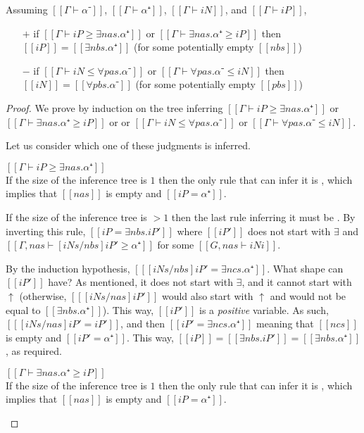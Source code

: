 \begin{lemma}
  \label{lemma:var-subt}
  Assuming $[[Γ ⊢  α⁻]]$, $[[Γ ⊢ α⁺]]$, $[[Γ ⊢ iN]]$, and $[[Γ ⊢ iP]]$,
  \begin{itemize}
  \item[$+$] if $[[Γ ⊢ iP ≥ ∃nas.α⁺]]$ or $[[Γ ⊢ ∃nas.α⁺ ≥ iP ]]$ then $[[iP]] = [[∃nbs.α⁺]]$ (for some potentially empty $[[nbs]]$)
  \item[$-$] if $[[Γ ⊢ iN ≤ ∀pas.α⁻]]$ or $[[Γ ⊢ ∀pas.α⁻ ≤ iN ]]$ then $[[iN]] = [[∀pbs.α⁻]]$ (for some potentially empty $[[pbs]]$)
  \end{itemize}
\end{lemma}
\begin{proof}
  We prove by induction on the tree
  inferring $[[Γ ⊢ iP ≥ ∃nas.α⁺]]$ or $[[Γ ⊢ ∃nas.α⁺ ≥ iP ]]$ or
  or $[[Γ ⊢ iN ≤ ∀pas.α⁻]]$ or $[[Γ ⊢ ∀pas.α⁻ ≤ iN ]]$.

  Let us consider which one of these judgments is inferred.
  \begin{caseof}
  \item $[[Γ ⊢ iP ≥ ∃nas.α⁺]]$\\
    If the size of the inference tree is $1$ then the only rule that can infer
    it is , which
    implies that $[[nas]]$ is empty and $[[iP = α⁺]]$.

    If the size of the inference tree is $>1$ then the last rule inferring
    it must be . By inverting this rule,
    $[[iP = ∃nbs.iP']]$ where $[[iP']]$ does not start with $\exists$ and
    $[[Γ, nas ⊢ [iNs/nbs] iP' ≥ α⁺]]$ for some $[[G, nas ⊢ iNi]]$.

    By the induction hypothesis, $[[ [iNs/nbs] iP' = ∃ncs.α⁺]]$.
    What shape can $[[iP']]$ have?
    As mentioned, it does not start with $\exists$, and it cannot start with
    $\uparrow$ (otherwise, $[[ [iNs/nas] iP' ]]$ would also
    start with $\uparrow$ and would not be equal to $[[∃nbs.α⁺]]$).
    This way, $[[iP']]$ is a \emph{positive} variable. 
    As such, $[[ [iNs/nas] iP' = iP']]$,
    and then $[[iP' = ∃ncs.α⁺]]$ meaning that $[[ncs]]$ is empty and $[[iP' = α⁺]]$.
    This way, $[[iP]] = [[∃nbs.iP']] = [[∃nbs.α⁺]]$, as required.

  \item $[[Γ ⊢ ∃nas.α⁺ ≥ iP]]$\\
    If the size of the inference tree is $1$ then the only rule that can infer
    it is , which
    implies that $[[nas]]$ is empty and $[[iP = α⁺]]$.


\end{caseof}
\end{proof}
